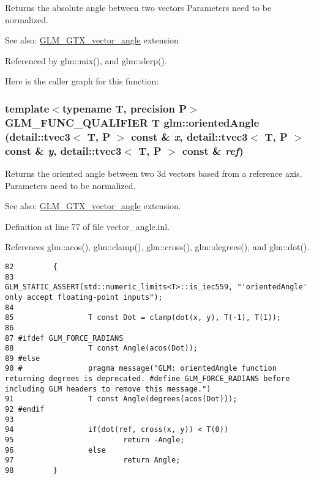 Returns the absolute angle between two vectors Parameters need to be normalized. \begin{Desc}
\item[See also:]\hyperlink{group__gtx__vector__angle}{GLM\_\-GTX\_\-vector\_\-angle} extension \end{Desc}


Referenced by glm::mix(), and glm::slerp().

Here is the caller graph for this function:\hypertarget{group__gtx__vector__angle_gc56a6bdc5d430b476514d64cb185b772}{
\subsubsection[orientedAngle]{\setlength{\rightskip}{0pt plus 5cm}template$<$typename T, precision P$>$ GLM\_\-FUNC\_\-QUALIFIER T glm::orientedAngle (detail::tvec3$<$ T, P $>$ const \& {\em x}, \/  detail::tvec3$<$ T, P $>$ const \& {\em y}, \/  detail::tvec3$<$ T, P $>$ const \& {\em ref})}}
\label{group__gtx__vector__angle_gc56a6bdc5d430b476514d64cb185b772}


Returns the oriented angle between two 3d vectors based from a reference axis. Parameters need to be normalized. \begin{Desc}
\item[See also:]\hyperlink{group__gtx__vector__angle}{GLM\_\-GTX\_\-vector\_\-angle} extension. \end{Desc}


Definition at line 77 of file vector\_\-angle.inl.

References glm::acos(), glm::clamp(), glm::cross(), glm::degrees(), and glm::dot().

\begin{Code}\begin{verbatim}82         {
83                 GLM_STATIC_ASSERT(std::numeric_limits<T>::is_iec559, "'orientedAngle' only accept floating-point inputs");
84 
85                 T const Dot = clamp(dot(x, y), T(-1), T(1));
86 
87 #ifdef GLM_FORCE_RADIANS
88                 T const Angle(acos(Dot));
89 #else
90 #               pragma message("GLM: orientedAngle function returning degrees is deprecated. #define GLM_FORCE_RADIANS before including GLM headers to remove this message.")
91                 T const Angle(degrees(acos(Dot)));
92 #endif
93 
94                 if(dot(ref, cross(x, y)) < T(0))
95                         return -Angle;
96                 else
97                         return Angle;
98         }
\end{verbatim}
\end{Code}




